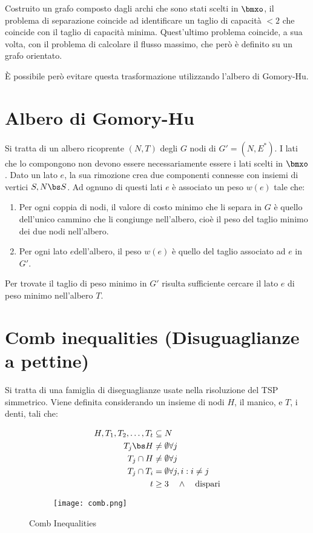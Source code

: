 \documentclass[\main/main.tex]{subfiles}
\begin{document}
Costruito un grafo composto dagli archi che sono stati scelti in \(\bmxo \), il problema di separazione coincide ad identificare un taglio di capacità \(<2\) che coincide con il taglio di capacità minima. Quest'ultimo problema coincide, a sua volta, con il problema di calcolare il flusso massimo, che però è definito su un grafo orientato.

È possibile però evitare questa trasformazione utilizzando l'albero di Gomory-Hu.

\section{Albero di Gomory-Hu}
Si tratta di un albero ricoprente \((N,T)\) degli \(G\) nodi di \(G'=(N,E^*)\). I lati che lo compongono non devono essere necessariamente essere i lati scelti in \(\bmxo \). Dato un lato \(e\), la sua rimozione crea due componenti connesse con insiemi di vertici \(S, N\bs S\). Ad ognuno di questi lati \(e\) è associato un peso \(w(e)\) tale che:

\begin{enumerate}
\item Per ogni coppia di nodi, il valore di costo minimo che li separa in \(G\) è quello dell'unico cammino che li congiunge nell'albero, cioè il peso del taglio minimo dei due nodi nell'albero.
\item Per ogni lato \(e\)dell'albero, il peso \(w(e)\) è quello del taglio associato ad \(e\) in \(G'\).
\end{enumerate}

Per trovate il taglio di peso minimo in \(G'\) risulta sufficiente cercare il lato \(e\) di peso minimo nell'albero \(T\).

\section{Comb inequalities (Disuguaglianze a pettine)}
Si tratta di una famiglia di diseguaglianze usate nella risoluzione del TSP simmetrico. Viene definita considerando un insieme di nodi \(H\), il manico, e \(T\), i denti, tali che:

\begin{figure}
    \begin{subfigure}{0.49\textwidth}
        \begin{align*}
            H, T_1, T_2, \ldots, T_t &\subseteq N\\
            T_j\bs H &\neq \emptyset \forall j\\
            T_j \cap H &\neq \emptyset \forall j\\
            T_j \cap T_i &= \emptyset \forall j,i: i\neq j\\
            t &\geq 3 \quad \land \quad \text{dispari}
        \end{align*}
    \end{subfigure}
    \begin{subfigure}{0.49\textwidth}
        \texttt{[image: comb.png]}
    \end{subfigure}
    \caption{Comb Inequalities}
\end{figure}
\end{document}
